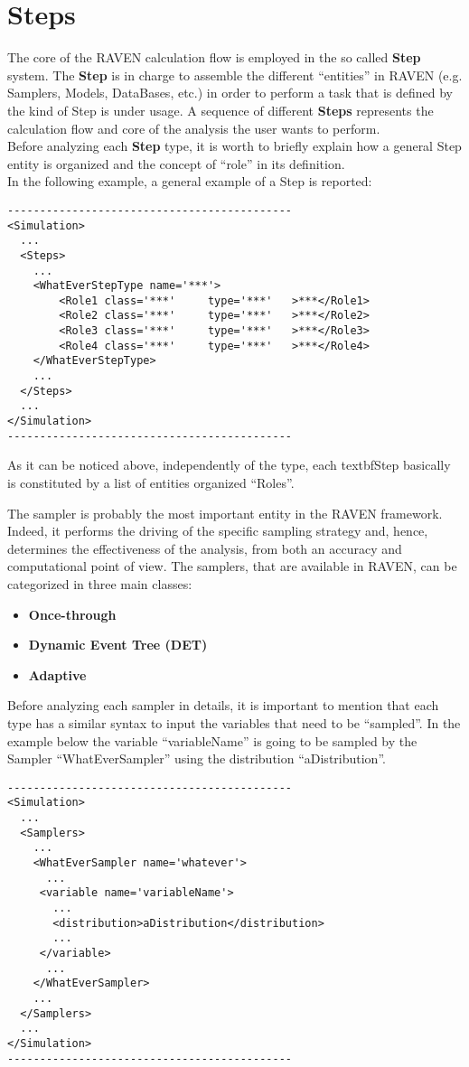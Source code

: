 \section{Steps  \\ \vspace{2 mm} {\small }}
\label{sec:steps}
The core of the RAVEN calculation flow is employed in the so called \textbf{Step} system. The \textbf{Step} is in charge to assemble the different ``entities'' in RAVEN (e.g. Samplers, Models, DataBases, etc.) in order to perform a task that is defined by the kind of Step is under usage. A sequence of different \textbf{Steps} represents the calculation flow and core of the analysis the user wants to perform. 
\\Before analyzing each \textbf{Step} type, it is worth to briefly explain how a general Step entity is organized and the concept of ``role'' in its definition.
\\In the following example, a general example of a Step is reported:
\begin{lstlisting}[style=XML]
--------------------------------------------
<Simulation>
  ...
  <Steps>
    ...
    <WhatEverStepType name='***'>
        <Role1 class='***'     type='***'   >***</Role1>
        <Role2 class='***'     type='***'   >***</Role2>
        <Role3 class='***'     type='***'   >***</Role3>
        <Role4 class='***'     type='***'   >***</Role4>
    </WhatEverStepType>
    ...
  </Steps>
  ...
</Simulation>
--------------------------------------------
\end{lstlisting}
As it can be noticed above, independently of the type, each textbf{Step} basically is constituted by a list of entities organized ``Roles''.  



The sampler is probably the most important entity in the RAVEN framework. Indeed, it performs the driving of the specific sampling strategy and, hence, determines the effectiveness of the analysis, from both an accuracy and computational point of view.  The samplers, that are available in RAVEN, can be categorized in three main classes:
\begin{itemize}
\item \textbf{Once-through}
\item \textbf{Dynamic Event Tree (DET)}
\item \textbf{Adaptive}
\end{itemize}
Before analyzing  each sampler in details, it is important to mention that each type has a similar syntax to input the variables that need to be ``sampled''. In the example below the variable ``variableName'' is going to be sampled by the Sampler ``WhatEverSampler'' using the distribution ``aDistribution''. 
\begin{lstlisting}[style=XML]
--------------------------------------------
<Simulation>
  ...
  <Samplers>
    ...
    <WhatEverSampler name='whatever'>
      ...
     <variable name='variableName'> 
       ...
       <distribution>aDistribution</distribution>
       ...
     </variable>
      ... 
    </WhatEverSampler>
    ...
  </Samplers>
  ...
</Simulation>
--------------------------------------------
\end{lstlisting}

